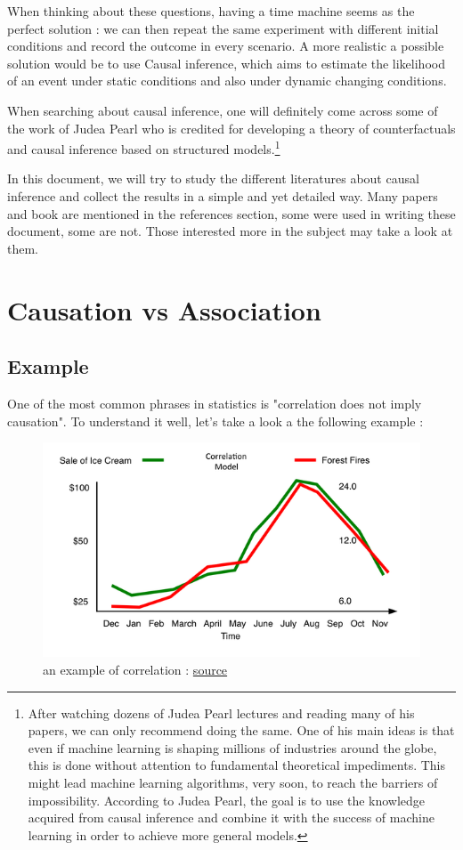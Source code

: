 \documentclass{article}
\begin{document}
When thinking about these questions, having a time machine seems as the perfect solution : we can then repeat the same experiment with different initial conditions and record the outcome in every scenario. A more realistic a possible solution would be to use Causal inference, which aims to estimate the likelihood of an event under static conditions and also under dynamic changing conditions.

When searching about causal inference, one will definitely come across some of the work of Judea Pearl who is credited for developing a theory of counterfactuals and causal inference based on structured models.\footnote{After watching dozens of Judea Pearl lectures and reading many of his papers, we can only recommend doing the same. One of his main ideas is that even if machine learning is shaping millions of industries around the globe, this is done without attention to fundamental theoretical impediments. This might lead machine learning algorithms, very soon, to reach the barriers of impossibility. According to Judea Pearl, the goal is to use the knowledge acquired from causal inference and combine it with the success of machine learning in order to achieve more general models.}

In this document, we will try to study the different literatures about causal inference and collect the results in a simple and yet detailed way. Many papers and book are mentioned in the references section, some were used in writing these document, some are not. Those interested more in the subject may take a look at them.  


\newpage

\section{Causation vs Association}
\subsection{Example}
\cite{pearl2019seven} \cite{hernan2020causal}  One of the most common phrases in statistics is "correlation does not imply causation". To understand it well, let's take a look a the following example :

\begin{figure}[h]
\centering
\includegraphics[width=0.6 \textwidth]{figures/corr_caus.png}
\caption{an example of correlation : \href{https://www.decisionskills.com/blog/how-ice-cream-kills-understanding-cause-and-effect}{source}}
\end{figure}
\end{document}
